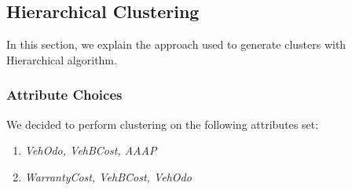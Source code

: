 \documentclass{article}
\begin{document}
	\subsection{Hierarchical Clustering}
	In this section, we explain the approach used to generate clusters with Hierarchical algorithm.
	\subsubsection{Attribute Choices}
	We decided to perform clustering on the following attributes set:
	\begin{enumerate}
		\item \emph{VehOdo, VehBCost, AAAP}
		\item \emph{WarrantyCost, VehBCost, VehOdo}
	\end{enumerate}
	
\end{document}
